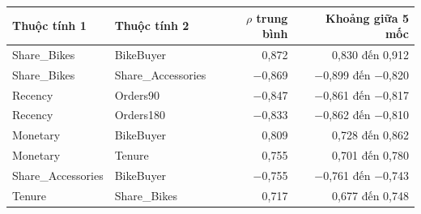 \begin{tabular}{llrr}
\toprule
Thuộc tính 1 & Thuộc tính 2 & $\rho$ trung bình & Khoảng giữa 5 mốc \\
\midrule
Share\_Bikes & BikeBuyer & 0,872 & 0,830 đến 0,912 \\
Share\_Bikes & Share\_Accessories & $-$0,869 & $-$0,899 đến $-$0,820 \\
Recency & Orders90 & $-$0,847 & $-$0,861 đến $-$0,817 \\
Recency & Orders180 & $-$0,833 & $-$0,862 đến $-$0,810 \\
Monetary & BikeBuyer & 0,809 & 0,728 đến 0,862 \\
Monetary & Tenure & 0,755 & 0,701 đến 0,780 \\
Share\_Accessories & BikeBuyer & $-$0,755 & $-$0,761 đến $-$0,743 \\
Tenure & Share\_Bikes & 0,717 & 0,677 đến 0,748 \\
\bottomrule
\end{tabular}

